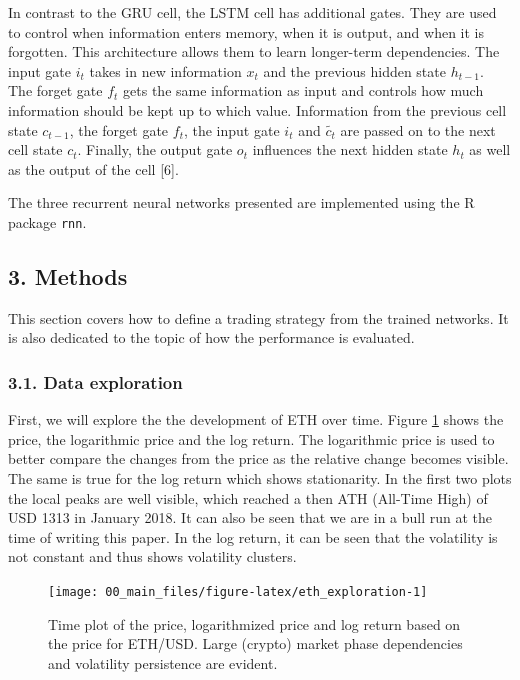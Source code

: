 \documentclass[
]{article}
\begin{document}
In contrast to the GRU cell, the LSTM cell has additional gates. They
are used to control when information enters memory, when it is output,
and when it is forgotten. This architecture allows them to learn
longer-term dependencies. The input gate \(i_t\) takes in new
information \(x_t\) and the previous hidden state \(h_{t-1}\). The
forget gate \(f_t\) gets the same information as input and controls how
much information should be kept up to which value. Information from the
previous cell state \(c_{t-1}\), the forget gate \(f_t\), the input gate
\(i_t\) and \(\tilde{c_t}\) are passed on to the next cell state
\(c_t\). Finally, the output gate \(o_t\) influences the next hidden
state \(h_t\) as well as the output of the cell {[}6{]}.

The three recurrent neural networks presented are implemented using the
R package \texttt{rnn}.

\newpage

\hypertarget{methods}{%
\subsection{3. Methods}\label{methods}}

This section covers how to define a trading strategy from the trained
networks. It is also dedicated to the topic of how the performance is
evaluated.

\hypertarget{data-exploration}{%
\subsubsection{3.1. Data exploration}\label{data-exploration}}

First, we will explore the the development of ETH over time. Figure
\ref{fig:eth_exploration} shows the price, the logarithmic price and the
log return. The logarithmic price is used to better compare the changes
from the price as the relative change becomes visible. The same is true
for the log return which shows stationarity. In the first two plots the
local peaks are well visible, which reached a then ATH (All-Time High)
of USD 1313 in January 2018. It can also be seen that we are in a bull
run at the time of writing this paper. In the log return, it can be seen
that the volatility is not constant and thus shows volatility clusters.

\begin{figure}

{\centering \texttt{[image: 00\_main\_files/figure-latex/eth\_exploration-1]} 

}

\caption{Time plot of the price, logarithmized price and log return based on the price for ETH/USD. Large (crypto) market phase dependencies and volatility persistence are evident.}\label{fig:eth_exploration}
\end{figure}
\end{document}
